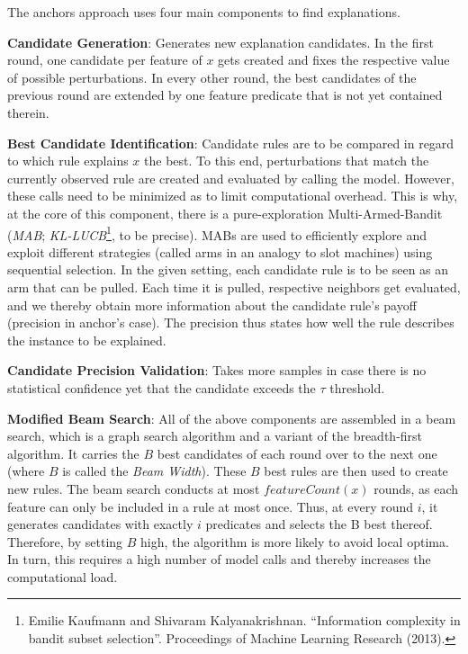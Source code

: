 \documentclass[
  10pt,
]{scrbook}
\begin{document}
The anchors approach uses four main components to find explanations.

\textbf{Candidate Generation}: Generates new explanation candidates. In the first round, one candidate per feature of \(x\) gets created and fixes the respective value of possible perturbations. In every other round, the best candidates of the previous round are extended by one feature predicate that is not yet contained therein.

\textbf{Best Candidate Identification}: Candidate rules are to be compared in regard to which rule explains \(x\) the best. To this end, perturbations that match the currently observed rule are created and evaluated by calling the model. However, these calls need to be minimized as to limit computational overhead. This is why, at the core of this component, there is a pure-exploration Multi-Armed-Bandit (\emph{MAB}; \emph{KL-LUCB}\footnote{Emilie Kaufmann and Shivaram Kalyanakrishnan. ``Information complexity in bandit subset selection''. Proceedings of Machine Learning Research (2013).}, to be precise). MABs are used to efficiently explore and exploit different strategies (called arms in an analogy to slot machines) using sequential selection. In the given setting, each candidate rule is to be seen as an arm that can be pulled. Each time it is pulled, respective neighbors get evaluated, and we thereby obtain more information about the candidate rule's payoff (precision in anchor's case). The precision thus states how well the rule describes the instance to be explained.

\textbf{Candidate Precision Validation}: Takes more samples in case there is no statistical confidence yet that the candidate exceeds the \(\tau\) threshold.

\textbf{Modified Beam Search}: All of the above components are assembled in a beam search, which is a graph search algorithm and a variant of the breadth-first algorithm. It carries the \(B\) best candidates of each round over to the next one (where \(B\) is called the \emph{Beam Width}). These \(B\) best rules are then used to create new rules. The beam search conducts at most \(featureCount(x)\) rounds, as each feature can only be included in a rule at most once. Thus, at every round \(i\), it generates candidates with exactly \(i\) predicates and selects the B best thereof. Therefore, by setting \(B\) high, the algorithm is more likely to avoid local optima. In turn, this requires a high number of model calls and thereby increases the computational load.
\end{document}
